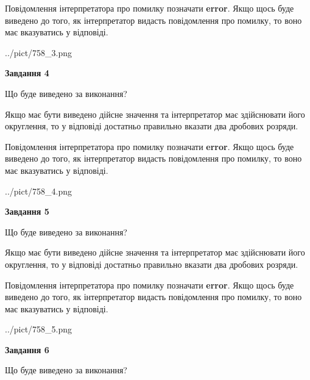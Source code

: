 \documentclass[12pt, ukrainian]{article}
\begin{document}
{\begin {Large}
Повідомлення інтерпретатора про помилку позначати \textbf{error}.
Якщо щось буде виведено до того, як інтерпретатор видасть повідомлення про помилку, 
то воно має вказуватись у відповіді. \par

\begin{center}
	{../pict/758_3.png}
\end{center}
\newpage

{\begin {center}\textbf{Завдання 4}\end {center}}\par
Що буде виведено за виконання? \par

Якщо має бути виведено дійсне значення та інтерпретатор має здійснювати його округлення, 
то у відповіді достатньо правильно вказати два дробових розряди.

Повідомлення інтерпретатора про помилку позначати \textbf{error}.
Якщо щось буде виведено до того, як інтерпретатор видасть повідомлення про помилку, 
то воно має вказуватись у відповіді. \par

\begin{center}
	{../pict/758_4.png}
\end{center}
\newpage

{\begin {center}\textbf{Завдання 5}\end {center}}\par
Що буде виведено за виконання? \par

Якщо має бути виведено дійсне значення та інтерпретатор має здійснювати його округлення, 
то у відповіді достатньо правильно вказати два дробових розряди.

Повідомлення інтерпретатора про помилку позначати \textbf{error}.
Якщо щось буде виведено до того, як інтерпретатор видасть повідомлення про помилку, 
то воно має вказуватись у відповіді. \par

\begin{center}
	{../pict/758_5.png}
\end{center}
\newpage

{\begin {center}\textbf{Завдання 6}\end {center}}\par
Що буде виведено за виконання? \par


\end{Large}}
\end{document}
